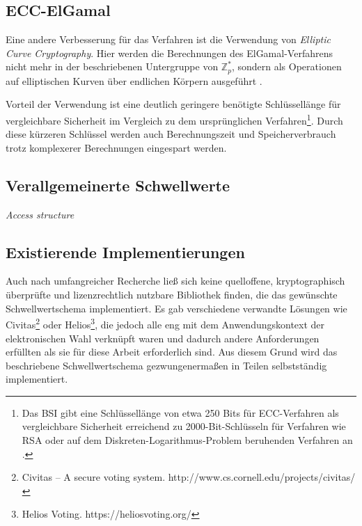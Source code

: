 \subsection{ECC-ElGamal}

\label{sec_state_threshold_ecc}

Eine andere Verbesserung für das Verfahren ist die Verwendung von \textit{Elliptic Curve Cryptography}. Hier werden die Berechnungen des ElGamal-Verfahrens nicht mehr in der beschriebenen Untergruppe von \(\mathbb{Z}_p^*\), sondern als Operationen auf elliptischen Kurven über endlichen Körpern ausgeführt \cite{koblitz1987elliptic}.

Vorteil der Verwendung ist eine deutlich geringere benötigte Schlüssellänge für vergleichbare Sicherheit im Vergleich zu dem ursprünglichen Verfahren\footnote{
  Das BSI gibt eine Schlüssellänge von etwa 250 Bits für ECC-Verfahren als vergleichbare Sicherheit erreichend zu 2000-Bit-Schlüsseln für Verfahren wie RSA oder auf dem Diskreten-Logarithmus-Problem beruhenden Verfahren an \cite{bsi2018}.
}. Durch diese kürzeren Schlüssel werden auch Berechnungszeit und Speicherverbrauch trotz komplexerer Berechnungen eingespart werden.

\subsection{Verallgemeinerte Schwellwerte}

\cite{ito1989secret} \textit{Access structure}

\subsection{Existierende Implementierungen}

\label{sec_state_threshold_existing_impl}

Auch nach umfangreicher Recherche ließ sich keine quelloffene, kryptographisch überprüfte und lizenzrechtlich nutzbare Bibliothek finden, die das gewünschte Schwellwertschema implementiert. Es gab verschiedene verwandte Lösungen wie Civitas\footnote{
  Civitas -- A secure voting system. http://www.cs.cornell.edu/projects/civitas/
} oder Helios\footnote{
  Helios Voting. https://heliosvoting.org/
}, die jedoch alle eng mit dem Anwendungskontext der elektronischen Wahl verknüpft waren und dadurch andere Anforderungen erfüllten als sie für diese Arbeit erforderlich sind. Aus diesem Grund wird das beschriebene Schwellwertschema gezwungenermaßen in Teilen selbstständig implementiert.